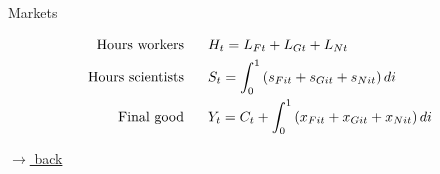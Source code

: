 \documentclass[11pt,aspectratio=169]{beamer}
\begin{document}
%		
%		
%	

	
\begin{frame}{Markets}
	\begin{minipage}[t!]{1\textwidth}
		\begin{align*}
			\text{Hours workers}&\hspace{6mm}		H_{t}=L_{Ft}+L_{Gt}+L_{Nt}\\
			\text{Hours scientists}&\hspace{6mm}	S_{t} = \int_{0}^{1}\left(s_{Fit}+s_{Git}+s_{Nit}\right)di\\
			\text{Final good}&\hspace{6mm}	Y_t =C_t+\int_{0}^{1}\left(x_{Fit}+x_{Git}+x_{Nit}\right)di
		\end{align*}
	\end{minipage}

\hfill \hyperlink{backScheme}{\tiny{$\rightarrow$ back}}
\end{frame}
		
		
		
\end{document}

